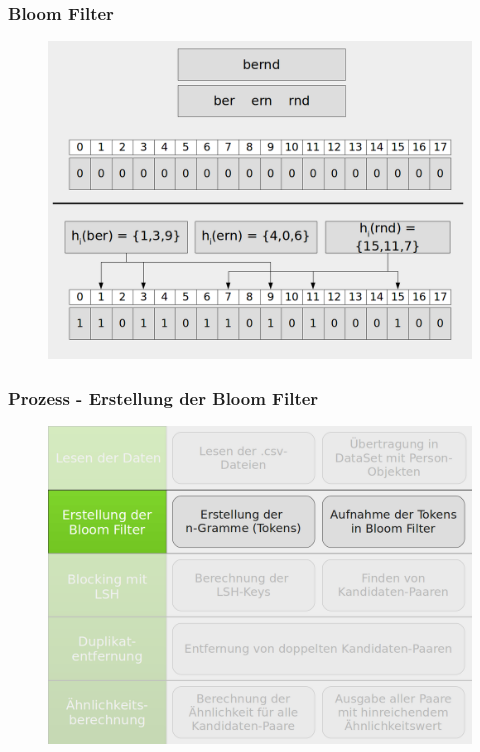 \documentclass{beamer}
\begin{document}
    \begin{frame}
    		\frametitle{Bloom Filter}
            \begin{figure}[H]
                \includegraphics[width=\textwidth]{graphics/bloom_qgram.png}
            \end{figure}
    \end{frame}

    \begin{frame}
    		\frametitle{Prozess - Erstellung der Bloom Filter}
    		\begin{figure}[H]
    			\includegraphics[width=\textwidth]{graphics/process_2.png}
    		\end{figure}
    \end{frame}
    
\end{document}
